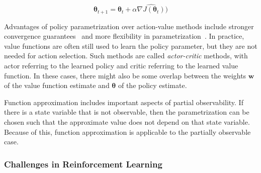 \[
    \boldsymbol{\theta}_{t+1} = \boldsymbol{\theta}_t + \alpha \hat{\nabla J(\boldsymbol{\theta}_t)}) 
\]

Advantages of policy parametrization over action-value methods include stronger convergence guarantees~\cite{sutton_policygrad_1999} and more flexibility in parametrization~\cite{sutton_reinforcement_2018}. In practice, value functions are often still used to learn the policy parameter, but they are not needed for action selection.
Such methods are called \textit{actor-critic} methods, with actor referring to the learned policy and critic referring to the learned value function.
In these cases, there might also be some overlap between the weights \(\mathbf{w}\) of the value function estimate and \(\boldsymbol{\theta}\) of the policy estimate. 

Function approximation includes important aspects of partial observability.
If there is a state variable that is not observable,
then the parametrization can be chosen such that the approximate value does not depend on that state variable.
Because of this, function approximation is applicable to the partially observable case.



\subsubsection{Challenges in Reinforcement Learning}

